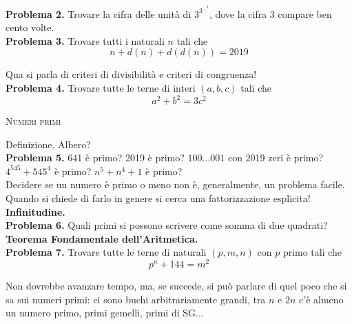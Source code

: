 \documentclass[a4paper]{article}
\theoremstyle{remark}
\theoremstyle{definition}
\begin{document}
\begin{multicols}{2}
\begin{enumerate}
	\end{enumerate}
	
	\textbf{Problema 2.} Trovare la cifra delle unità di $ 3^{3^{\dots^3}} $, dove la cifra $ 3 $ compare ben cento volte. \\
	
	\textbf{Problema 3.} Trovare tutti i naturali $ n $ tali che \[ n + d(n) + d(d(n)) = 2019 \]
	
	\textsf{Qua si parla di criteri di divisibilità e criteri di congruenza!}\\
	
	\textbf{Problema 4.} Trovare tutte le terne di interi $ (a, b, c) $ tali che $$  a^2 + b^2 = 3c^2  $$
	
	\begin{center}
		\textsc{Numeri primi}
	\end{center}
	\textsf{Definizione. Albero?}\\
	
	\textbf{Problema 5.} 641 è primo? 2019 è primo? $ 1{00\dots 00}1 $ con 2019 zeri è primo? $ 4^{545} + 545^4 $ è primo? $ n^5 + n^4 +1 $ è primo? \\
	
	\textsf{Decidere se un numero è primo o meno non è, generalmente, un problema facile. Quando si chiede di farlo in genere si cerca una fattorizzazione esplicita!}\\
	
	\textbf{Infinitudine.} \\
	
	\textbf{Problema 6.} Quali primi si possono scrivere come somma di due quadrati? \\

	\textbf{Teorema Fondamentale dell'Aritmetica.} \\
	
	\textbf{Problema 7.} Trovare tutte le terne di naturali $ (p, m, n) $ con $ p $ primo tali che
	\[ p^n +144 = m^2 \]
	
	
	\textsf{Non dovrebbe avanzare tempo, ma, se succede, si può parlare di quel poco che si sa sui numeri primi: ci sono buchi arbitrariamente grandi, tra $ n $ e $ 2n $ c'è almeno un numero primo, primi gemelli, primi di SG...}
	
	
	
\end{multicols}

\newpage
\end{document}
